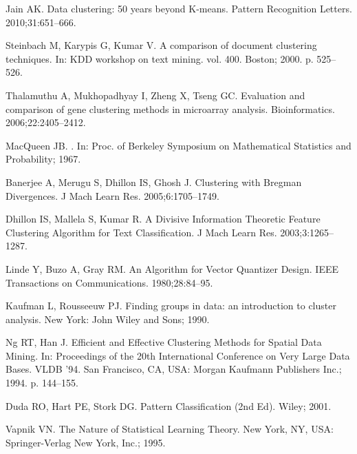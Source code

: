 \documentclass[10pt,letterpaper]{article}
\begin{document}
\begin{thebibliography}{10}

  Jain AK.
  \newblock Data clustering: 50 years beyond K-means.
  \newblock Pattern Recognition Letters. 2010;31:651--666.

  Steinbach M, Karypis G, Kumar V.
  \newblock A comparison of document clustering techniques.
  \newblock In: KDD workshop on text mining. vol. 400. Boston; 2000. p. 525--526.

  Thalamuthu A, Mukhopadhyay I, Zheng X, Tseng GC.
  \newblock Evaluation and comparison of gene clustering methods in microarray
    analysis.
  \newblock Bioinformatics. 2006;22:2405--2412.

  MacQueen JB.
  .
  \newblock In: Proc. of Berkeley Symposium on Mathematical Statistics and
    Probability; 1967.

  Banerjee A, Merugu S, Dhillon IS, Ghosh J.
  \newblock Clustering with Bregman Divergences.
  \newblock J Mach Learn Res. 2005;6:1705--1749.

  Dhillon IS, Mallela S, Kumar R.
  \newblock A Divisive Information Theoretic Feature Clustering Algorithm for
    Text Classification.
  \newblock J Mach Learn Res. 2003;3:1265--1287.

  Linde Y, Buzo A, Gray RM.
  \newblock An Algorithm for Vector Quantizer Design.
  \newblock IEEE Transactions on Communications. 1980;28:84--95.

  Kaufman L, Rousseeuw PJ.
  \newblock Finding groups in data: an introduction to cluster analysis.
  \newblock New York: John Wiley and Sons; 1990.

  Ng RT, Han J.
  \newblock Efficient and Effective Clustering Methods for Spatial Data Mining.
  \newblock In: Proceedings of the 20th International Conference on Very Large
    Data Bases. VLDB '94. San Francisco, CA, USA: Morgan Kaufmann Publishers
    Inc.; 1994. p. 144--155.

  Duda RO, Hart PE, Stork DG.
  \newblock Pattern Classification (2nd Ed).
  \newblock Wiley; 2001.

  Vapnik VN.
  \newblock The Nature of Statistical Learning Theory.
  \newblock New York, NY, USA: Springer-Verlag New York, Inc.; 1995.


\end{thebibliography}
\end{document}
